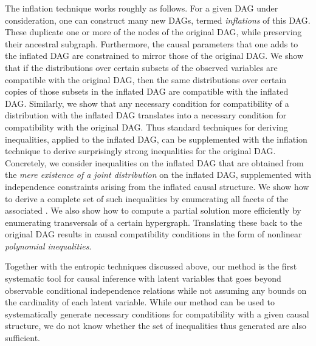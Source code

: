 The inflation technique works roughly as follows. For a given DAG under consideration, one can construct many new DAGs, termed {\em inflations} of this DAG. These duplicate one or more of the nodes of the original DAG, while preserving their ancestral subgraph.  Furthermore, the causal parameters that one adds to the inflated DAG are constrained to mirror those of the original DAG.  We show that if the distributions over certain subsets of the observed variables are compatible with the original DAG, then the same distributions over certain copies of those subsets in the inflated DAG are compatible with the inflated DAG.  Similarly, we show that any necessary condition for compatibility of a distribution with the inflated DAG translates into a necessary condition for compatibility with the original DAG.  Thus standard techniques for deriving inequalities, applied to the inflated DAG, can be supplemented with the inflation technique to derive surprisingly strong inequalities for the original DAG.  Concretely, we consider inequalities on the inflated DAG that are obtained from the \emph{mere existence of a joint distribution} on the inflated DAG, supplemented with independence constraints arising from the inflated causal structure.   We show how to derive a complete set of such inequalities by enumerating all facets of the associated . We also show how to compute a partial solution more efficiently by enumerating transversals of a certain hypergraph. Translating these back to the original DAG results in causal compatibility conditions in the form of nonlinear \emph{polynomial inequalities}.

Together with the entropic techniques discussed above, our method is the first systematic tool for causal inference with latent variables that goes beyond observable conditional independence relations while not assuming any bounds on the cardinality of each latent variable. While our method can be used to systematically generate necessary conditions for compatibility with a given causal structure, we do not know whether the set of inequalities thus generated are also sufficient.  


